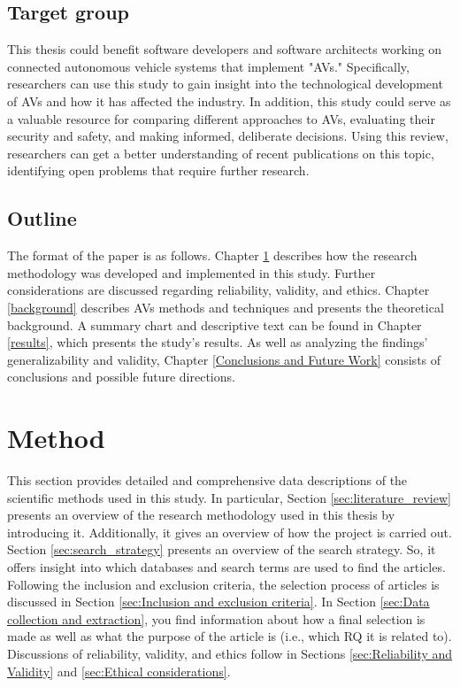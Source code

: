 \documentclass[a4paper,12pt]{article}
\begin{document}
\subsection{Target group}
\hspace{5mm} This thesis could benefit software developers and software architects working on connected autonomous vehicle systems that implement "AVs." Specifically, researchers can use this study to gain insight into the technological development of AVs and how it has affected the industry. In addition, this study could serve as a valuable resource for comparing different approaches to AVs, evaluating their security and safety, and making informed, deliberate decisions. Using this review, researchers can get a better understanding of recent publications on this topic, identifying open problems that require further research.

\newpage
\subsection{Outline}
\hspace{5mm} The format of the paper is as follows. Chapter \ref{Method} describes how the research methodology was developed and implemented in this study. Further considerations are discussed regarding reliability, validity, and ethics. Chapter \ref{background} describes AVs methods and techniques and presents the theoretical background. A summary chart and descriptive text can be found in Chapter \ref{results}, which presents the study's results. As well as analyzing the findings' generalizability and validity, Chapter \ref{Conclusions and Future Work} consists of conclusions and possible future directions. 


\newpage

\section{Method}
\label{Method}
\hspace{5mm} This section provides detailed and comprehensive data descriptions of the scientific methods used in this study. In particular, Section \ref{sec:literature_review} presents an overview of the research methodology used in this thesis by introducing it. Additionally, it gives an overview of how the project is carried out. Section \ref{sec:search_strategy} presents an overview of the search strategy. So, it offers insight into which databases and search terms are used to find the articles. Following the inclusion and exclusion criteria, the selection process of articles is discussed in Section \ref{sec:Inclusion and exclusion criteria}. In Section \ref{sec:Data collection and extraction}, you find information about how a final selection is made as well as what the purpose of the article is (i.e., which RQ it is related to). Discussions of reliability, validity, and ethics follow in Sections \ref{sec:Reliability and Validity} and \ref{sec:Ethical considerations}.
\end{document}
